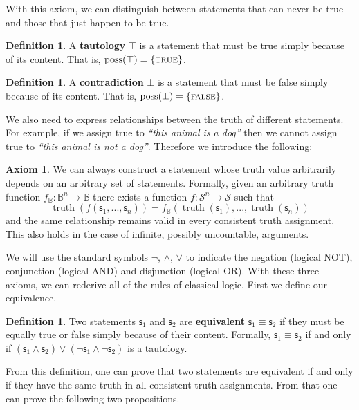 \documentclass[letterpaper]{article}
\theoremstyle{plain}%
\theoremstyle{definition}
\newtheorem{defn}[thrm]{Definition}
\newtheorem{axiom}[thrm]{Axiom}
\theoremstyle{remark}
\numberwithin{equation}{section}
\DeclareMathOperator{\truth}{truth}
\DeclareMathOperator{\possFn}{poss}
\def\TRUE{\textsc{true}}
\def\FALSE{\textsc{false}}
\def\tautology{\top}
\def\contradiction{\bot}
\def\AND{\wedge}
\def\OR{\vee}
\def\NOT{\neg}
\newcommand{\stmt}[1][s] {\mathsf{#1}}
\newcommand{\statement}[1] {\emph{``#1''}}
\begin{document}
With this axiom, we can distinguish between statements that can never be true and those that just happen to be true.

\begin{defn}
	A \textbf{tautology} $\tautology$ is a statement that must be true simply because of its content. That is, $\possFn(\tautology) = \{\TRUE\}$.
\end{defn}

\begin{defn}
	A \textbf{contradiction} $\contradiction$ is a statement that must be false simply because of its content. That is, $\possFn(\contradiction) = \{\FALSE\}$.
\end{defn}

We also need to express relationships between the truth of different statements. For example, if we assign true to \statement{this animal is a dog} then we cannot assign true to \statement{this animal is not a dog}. Therefore we introduce the following:


\begin{axiom}\label{ax_functions_of_statement}
	We can always construct a statement whose truth value arbitrarily depends on an arbitrary set of statements. Formally, given an arbitrary truth function $f_{\mathbb{B}} : \mathbb{B}^n \to \mathbb{B}$ there exists a function $f : \mathcal{S}^n \to \mathcal{S}$ such that
	$$\truth(f(\stmt_1, ..., \stmt_n)) = f_{\mathbb{B}}(\truth(\stmt_1), ..., \truth(\stmt_n))$$
	and the same relationship remains valid in every consistent truth assignment. This also holds in the case of infinite, possibly uncountable, arguments.
\end{axiom}

We will use the standard symbols $\NOT$, $\AND$, $\OR$ to indicate the negation (logical NOT), conjunction (logical AND) and disjunction (logical OR). With these three axioms, we can rederive all of the rules of classical logic. First we define our equivalence.

\begin{defn}
	Two statements $\stmt_1$ and $\stmt_2$ are \textbf{equivalent} $\stmt_1 \equiv \stmt_2$ if they must be equally true or false simply because of their content. Formally, $\stmt_1 \equiv \stmt_2$ if and only if $(\stmt_1 \AND \stmt_2) \OR (\NOT\stmt_1 \AND \NOT\stmt_2)$ is a tautology.
\end{defn}

From this definition, one can prove that two statements are equivalent if and only if they have the same truth in all consistent truth assignments. From that one can prove the following two propositions.
\end{document}

